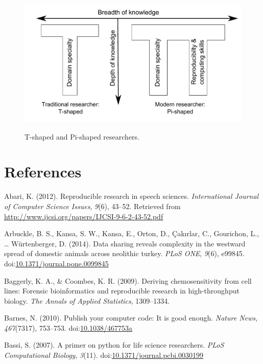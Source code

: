 \documentclass[american,man]{apa6}
\begin{document}
\newpage

\begin{figure}[h!]
  \caption{T-shaped and Pi-shaped researchers.}
  \centering
\includegraphics[width=\textwidth]{../figures/figure_t_and_pi_shaped.pdf}
\label{fig:shapes}
\end{figure}

\newpage

\section{References}\label{references}

\setlength{\parindent}{-0.5in} \setlength{\leftskip}{0.5in}
\setlength{\parskip}{8pt}

Abari, K. (2012). Reproducible research in speech sciences.
\emph{International Journal of Computer Science Issues}, \emph{9}(6),
43--52. Retrieved from
\url{http://www.ijcsi.org/papers/IJCSI-9-6-2-43-52.pdf}

Arbuckle, B. S., Kansa, S. W., Kansa, E., Orton, D., Çakırlar, C.,
Gourichon, L., \ldots{} Würtenberger, D. (2014). Data sharing reveals
complexity in the westward spread of domestic animals across neolithic
turkey. \emph{PLoS ONE}, \emph{9}(6), e99845.
doi:\href{http://dx.doi.org/10.1371/journal.pone.0099845}{10.1371/journal.pone.0099845}

Baggerly, K. A., \& Coombes, K. R. (2009). Deriving chemosensitivity
from cell lines: Forensic bioinformatics and reproducible research in
high-throughput biology. \emph{The Annals of Applied Statistics},
1309--1334.

Barnes, N. (2010). Publish your computer code: It is good enough.
\emph{Nature News}, \emph{467}(7317), 753--753.
doi:\href{http://dx.doi.org/10.1038/467753a}{10.1038/467753a}

Bassi, S. (2007). A primer on python for life science researchers.
\emph{PLoS Computational Biology}, \emph{3}(11).
doi:\href{http://dx.doi.org/10.1371/journal.pcbi.0030199}{10.1371/journal.pcbi.0030199}
\end{document}

